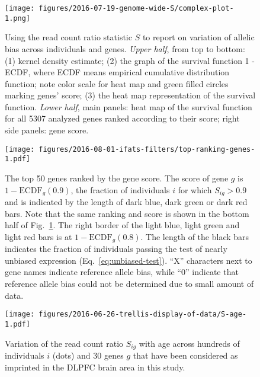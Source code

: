 \documentclass[12pt,letterpaper]{article}
\begin{document}
\begin{figure}[h]
\begin{center}
\texttt{[image: figures/2016-07-19-genome-wide-S/complex-plot-1.png]}
\end{center}
\caption{
Using the read count ratio statistic \(S\) to report on variation of allelic
bias across individuals and genes.  \emph{Upper half}, from top to bottom: (1)
kernel density estimate; (2) the graph of the survival function 1 - ECDF,
where ECDF means empirical cumulative distribution function; note color scale
for heat map and green filled circles marking genes' score; (3) the heat map
representation of the survival function.  \emph{Lower half}, main panels: heat
map of the survival function for all 5307 analyzed genes ranked according to
their score; right side panels: gene score.
}
\label{fig:ranking-genes}
\end{figure}

\begin{figure}[h]
\begin{center}
\texttt{[image: figures/2016-08-01-ifats-filters/top-ranking-genes-1.pdf]}
\caption{
The top 50 genes ranked by the gene score.  The score of gene \(g\) is \(1 -
\mathrm{ECDF}_g(0.9)\), the fraction of individuals \(i\) for which
\(S_{ig}>0.9\) and is indicated by the length of dark blue, dark green or dark
red bars.  Note that the same ranking and score is shown in the bottom half of
Fig.~\ref{fig:ranking-genes}.  The right border of the light blue, light green
and light red bars is at \(1 - \mathrm{ECDF}_g(0.8)\).  The length of the
black bars indicates the fraction of individuals passing the test of nearly
unbiased expression (Eq.~\ref{eq:unbiased-test}).  ``X'' characters next to
gene names indicate reference allele bias, while ``0'' indicate that
reference allele bias could not be determined due to small amount of data.
}
\label{fig:top-genes}
\end{center}
\end{figure}

\begin{figure}[h]
\begin{center}
\texttt{[image: figures/2016-06-26-trellis-display-of-data/S-age-1.pdf]}
\caption{
Variation of the read count ratio \(S_{ig}\) with age across hundreds of individuals
\(i\) (dots) and 30 genes \(g\) that have been considered as imprinted in the DLPFC
brain area in this study.
}
\label{fig:S-age}
\end{center}
\end{figure}
\end{document}
